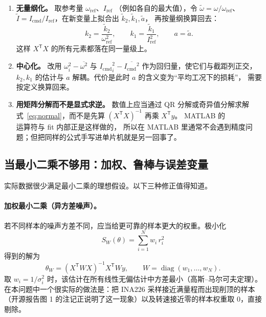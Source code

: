 \documentclass[cn,blue,11pt,device=normal]{elegantnote}
\newcommand{\code}[1]{{\ttfamily\small\def\_{\textunderscore\allowbreak}#1}}
\newcommand{\Icmd}{I_{\mathrm{cmd}}{}}
\newcommand{\fref}[1]{式~\eqref{#1}}
\begin{document}
\begin{enumerate}
  \item \textbf{无量纲化。} 取参考量 $\omega_{\mathrm{ref}}$、$I_{\mathrm{ref}}$
  （例如各自的最大值），令 $\tilde\omega=\omega/\omega_{\mathrm{ref}}$、
  $\tilde I=\Icmd/I_{\mathrm{ref}}$，在新变量上拟合出 $\tilde k_2,\tilde k_1,\tilde a$，
  再按量纲换算回去：
  \begin{equation}\label{eq:rescaling}
    k_2 = \frac{\tilde k_2}{\omega_{\mathrm{ref}}^{2}},\qquad
    k_1 = \frac{\tilde k_1}{I_{\mathrm{ref}}^{2}},\qquad
    a = \tilde a .
  \end{equation}
  这样 $X^{\mathsf T}X$ 的所有元素都落在同一量级上。
  \item \textbf{中心化。} 改用 $\omega_i^2-\overline{\omega^2}$ 与
  ${\Icmd}_i^2-\overline{\Icmd^2}$ 作为回归量，使它们与截距列正交，
  $k_2,k_1$ 的估计与 $a$ 解耦。代价是此时 $a$ 的含义变为“平均工况下的损耗”，
  需要按定义换算回来。
  \item \textbf{用矩阵分解而不是显式求逆。} 数值上应当通过 QR 分解或奇异值分解求解
  \fref{eq:normal}，而不是先算 $(X^{\mathsf T}X)^{-1}$ 再乘 $X^{\mathsf T}y$。
  MATLAB 的 \code{\\} 运算符与 \code{fit} 内部正是这样做的，
  所以在 MATLAB 里通常不会遇到精度问题；但把同样的公式手写进单片机就是另一回事了。
\end{enumerate}

\subsection{当最小二乘不够用：加权、鲁棒与误差变量}

实际数据很少满足最小二乘的理想假设。以下三种修正值得知道。

\paragraph{加权最小二乘（异方差噪声）。}
若不同样本的噪声方差不同，应当给更可靠的样本更大的权重。极小化
\begin{equation}
  S_W(\theta)=\sum_{i=1}^{N} w_i\,r_i^{2}
\end{equation}
得到的解为
\begin{equation}\label{eq:wls}
  \hat\theta_W = (X^{\mathsf T}WX)^{-1}X^{\mathsf T}Wy ,
  \qquad W=\operatorname{diag}(w_1,\dots,w_N).
\end{equation}
取 $w_i = 1/\sigma_i^{2}$ 时，该估计在所有线性无偏估计中方差最小（高斯--马尔可夫定理）。
在本问题中一个很实际的做法是：把 INA226 采样接近满量程而出现削顶的样本
（开源报告图 1 的注记正说明了这一现象）以及转速接近零的样本权重取 $0$，直接剔除。
\end{document}
